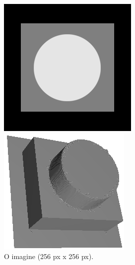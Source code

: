 \documentclass[12pt]{article}
\begin{document}
\begin{figure}[!htb]
	\begin{minipage}{0.24\textwidth}
		\centering
		\includegraphics[width=.95\linewidth]{Turn/TurnImg.jpg}
		\caption{O imagine (256 px x 256 px).}\label{fig:fig17}
	\end{minipage}\hfill
	\begin{minipage}{0.24\textwidth}
		\centering
		\includegraphics[width=.95\linewidth]{Turn/TurnNaiva.png}

\end{minipage}
\end{figure}
\end{document}
